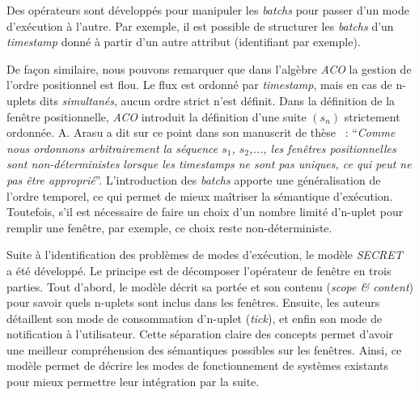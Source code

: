 Des opérateurs sont développés pour manipuler les \textit{batchs} pour passer d'un mode d'exécution à l'autre. Par exemple, il est possible de structurer les \textit{batchs} d'un \textit{timestamp} donné à partir d'un autre attribut (identifiant par exemple).

De façon similaire, nous pouvons remarquer que dans l'algèbre \textit{ACO} la gestion de l'ordre positionnel est flou. Le flux est ordonné par \textit{timestamp}, mais en cas de n-uplets dits \textit{simultanés}, aucun ordre strict n'est définit. Dans la définition de la fenêtre positionnelle, \textit{ACO} introduit la définition d'une suite $(s_n)$ strictement ordonnée. A. Arasu a dit sur ce point dans son manuscrit de thèse~\cite{Arasu:queries} : \enquote{\it Comme nous ordonnons arbitrairement la séquence $s_1$, $s_2$,..., les fenêtres positionnelles sont non-déterministes lorsque les \textit{timestamps} ne sont pas uniques, ce qui peut ne pas être approprié}. L'introduction des \textit{batchs} apporte une généralisation de l'ordre temporel, ce qui permet de mieux maîtriser la sémantique d'exécution. Toutefois, s'il est nécessaire de faire un choix d'un nombre limité d'n-uplet pour remplir une fenêtre, par exemple, ce choix reste non-déterministe.

Suite à l'identification des problèmes de modes d'exécution, le modèle \textit{SECRET}~\cite{Botan:secret} a été développé. Le principe est de décomposer l'opérateur de fenêtre en trois parties. Tout d'abord, le modèle décrit sa portée et son contenu (\textit{scope \& content}) pour savoir quels n-uplets sont inclus dans les fenêtres. Ensuite, les auteurs détaillent son mode de consommation d'n-uplet (\textit{tick}), et enfin son mode de notification à l'utilisateur. Cette séparation claire des concepts permet d'avoir une meilleur compréhension des sémantiques possibles sur les fenêtres. Ainsi, ce modèle permet de décrire les modes de fonctionnement de systèmes existants pour mieux permettre leur intégration par la suite.

